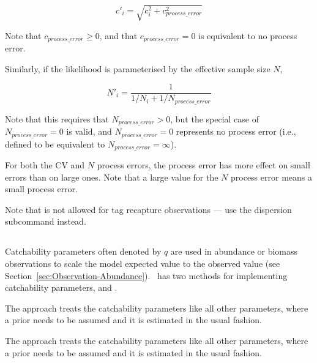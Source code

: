 \begin{equation}
  c'_i  = \sqrt {c_i^2  + c_{process\_error}^2 }
\end{equation}

Note that $c_{process\_ error} \ge 0$, and that $c_{process\_ error} = 0$ is equivalent to no process error.

Similarly, if the likelihood is parameterised by the effective sample size $N$,

\begin{equation}
 N'_i  = \frac{1}{1 / {N_i}+ 1 / N_{process\_error}}
\end{equation}

Note that this requires that $N_{process\_ error} > 0$, but the special case of $N_{process\_ error}=0$ is valid, and $N_{process\_ error}=0$ represents no process error (i.e., defined to be equivalent to $N_{process\_ error}=\infty$).

For both the CV and $N$ process errors, the process error has more effect on small errors than on large ones. Note that a large value for the $N$ process error means a small process error. 

Note that  is not allowed for tag recapture observations --- use the dispersion subcommand instead.

\subsection{}\label{subsec:catchabilities}

Catchability parameters often denoted by \(q\) are used in abundance or biomass observations to scale the model expected value to the observed value (see Section~\ref{sec:Observation-Abundance}). \CNAME\ has two methods for implementing catchability parameters,  and . 

The  approach treats the catchability parameters like all other parameters, where a prior needs to be assumed and it is estimated in the usual fashion.

The  approach treats the catchability parameters like all other parameters, where a prior needs to be assumed and it is estimated in the usual fashion.
\subsubsection{}\label{subsec:free}

